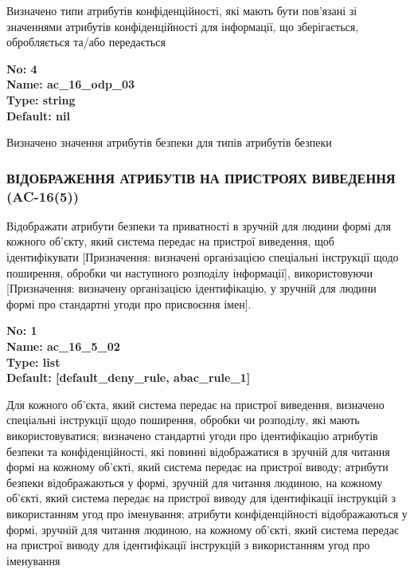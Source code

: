 \documentclass{article}
\begin{document}
{\footnotesize Визначено типи атрибутів конфіденційності, які мають бути пов'язані зі значеннями атрибутів конфіденційності для інформації, що зберігається, обробляється та/або передається}


{\footnotesize\bfseries
No: 4\\
Name: ac\_\allowbreak{}16\_\allowbreak{}odp\_\allowbreak{}03\\
Type: string\\
Default: nil
}

{\footnotesize Визначено значення атрибутів безпеки для типів атрибутів безпеки}




\subsubsection{ВІДОБРАЖЕННЯ АТРИБУТІВ НА ПРИСТРОЯХ ВИВЕДЕННЯ (AC-16(5))}
Відображати атрибути безпеки та приватності в зручній для людини формі для кожного об'єкту, який система передає на пристрої виведення, щоб ідентифікувати [Призначення: визначені організацією спеціальні інструкції щодо поширення, обробки чи наступного розподілу інформації], використовуючи [Призначення: визначену організацією ідентифікацію, у зручній для людини формі про стандартні угоди про присвоєння імен].

\vspace{10pt}
{\footnotesize\bfseries
No: 1\\
Name: ac\_\allowbreak{}16\_\allowbreak{}5\_\allowbreak{}02\\
Type: list\\
Default: [\textquotedbl{}default\_\allowbreak{}deny\_\allowbreak{}rule\textquotedbl{}, \textquotedbl{}abac\_\allowbreak{}rule\_\allowbreak{}1\textquotedbl{}]
}

{\footnotesize Для кожного об'єкта, який система передає на пристрої виведення, визначено спеціальні інструкції щодо поширення, обробки чи розподілу, які мають використовуватися; визначено стандартні угоди про ідентифікацію атрибутів безпеки та конфіденційності, які повинні відображатися в зручній для читання формі на кожному об'єкті, який система передає на пристрої виводу; атрибути безпеки відображаються у формі, зручній для читання людиною, на кожному об'єкті, який система передає на пристрої виводу для ідентифікації інструкцій з використанням угод про іменування; атрибути конфіденційності відображаються у формі, зручній для читання людиною, на кожному об'єкті, який система передає на пристрої виводу для ідентифікації інструкцій з використанням угод про іменування}
\end{document}

